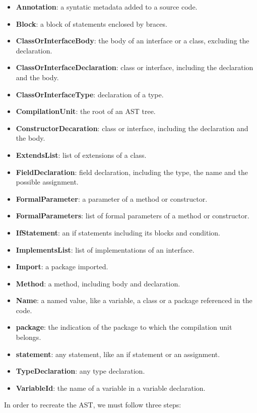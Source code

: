 \documentclass[
]{article}
\begin{document}
\begin{itemize}
\item \textbf{Annotation}: a syntatic metadata added to a source code.
\item \textbf{Block}: a block of statements enclosed by braces.
\item \textbf{ClassOrInterfaceBody}: the body of an interface or a class, excluding the declaration.
\item \textbf{ClassOrInterfaceDeclaration}: class or interface, including the declaration and the body.
\item \textbf{ClassOrInterfaceType}: declaration of a type.
\item \textbf{CompilationUnit}: the root of an AST tree.
\item \textbf{ConstructorDecaration}: class or interface, including the declaration and the body.
\item \textbf{ExtendsList}: list of extensions of a class.
\item \textbf{FieldDeclaration}: field declaration, including the type, the name and the possible assignment.
\item \textbf{FormalParameter}: a parameter of a method or constructor.
\item \textbf{FormalParameters}:  list of formal parameters of a method or constructor.
\item \textbf{IfStatement}: an if statements including its blocks and condition.
\item \textbf{ImplementsList}: list of implementations of an interface.
\item \textbf{Import}: a package imported.
\item \textbf{Method}: a method, including body and declaration.
\item \textbf{Name}: a named value, like a variable, a class or a package referenced in the code.
\item \textbf{package}: the indication of the package to which the compilation unit belongs.
\item \textbf{statement}: any statement, like an if statement or an assignment.
\item \textbf{TypeDeclaration}: any type declaration.
\item \textbf{VariableId}: the name of a variable in a variable declaration.
\end{itemize}

In order to recreate the AST, we must follow three steps:
\end{document}
